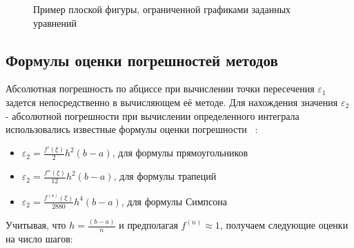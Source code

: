 \documentclass[a4paper,12pt,titlepage,finall]{article}
\begin{document}
\begin{figure}[h]
\centering
{}
\caption{Пример плоской фигуры, ограниченной графиками заданных уравнений}
\label{plot1}
\end{figure}

\subsection{Формулы оценки погрешностей методов}
Абсолютная погрешность по абциссе при вычислении точки пересечения $\varepsilon_1$
задется непосредственно в вычисляющем её методе. 
Для нахождения значения $\varepsilon_2$ - абсолютной погрешности при вычислении
определенного интеграла
использовались известные формулы оценки погрешности ~\cite{math}:
\begin{itemize}

  \item $\varepsilon_2 = \frac{f'(\xi)}{2} h^2 (b-a)$, для формулы прямоугольников

  \item $\varepsilon_2 = \frac{f''(\xi)}{12} h^2 (b-a)$, для формулы трапеций

  \item $\varepsilon_2 = \frac{f^{(4)}(\xi)}{2880} h^4 (b-a)$, для формулы Симпсона
\end{itemize}
Учитывая, что $h = \frac{(b-a)}{n}$ и предполагая $f^{(n)} \approx 1$, получаем следующие
оценки на число шагов:
\end{document}
